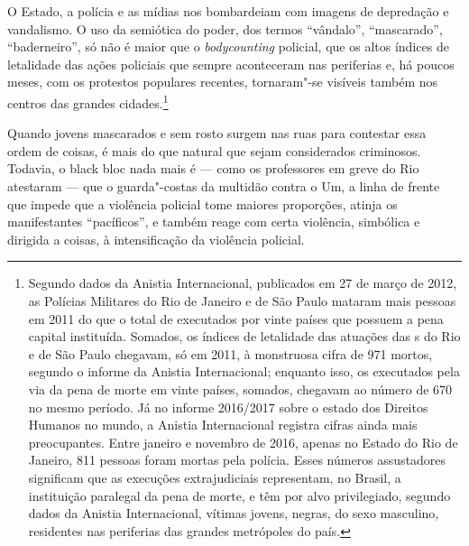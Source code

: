 O Estado, a polícia e as mídias nos bombardeiam com imagens de
depredação e vandalismo. O uso da semiótica do poder, dos termos
``vândalo'', ``mascarado'', ``baderneiro'', só não é maior que o
\emph{bodycounting} policial, que os altos índices de letalidade das
ações policiais que sempre aconteceram nas periferias e, há poucos
meses, com os protestos populares recentes, tornaram"-se visíveis também
nos centros das grandes cidades.\footnote{Segundo dados
  da Anistia Internacional, publicados em 27 de março de 2012, as
  Polícias Militares do Rio de Janeiro e de São Paulo mataram mais
  pessoas em 2011 do que o total de executados por vinte países que
  possuem a pena capital instituída. Somados, os índices de letalidade
  das atuações das s do Rio e de São Paulo chegavam, só em 2011, à
  monstruosa cifra de 971 mortos, segundo o informe da Anistia
  Internacional; enquanto isso, os executados pela via da pena de morte
  em vinte países, somados, chegavam ao número de 670 no mesmo período.
  Já no informe 2016/2017 sobre o estado dos Direitos Humanos no mundo,
  a Anistia Internacional registra cifras ainda mais preocupantes. Entre
  janeiro e novembro de 2016, apenas no Estado do Rio de Janeiro, 811
  pessoas foram mortas pela polícia. Esses números assustadores
  significam que as execuções extrajudiciais representam, no Brasil, a
  instituição paralegal da pena de morte, e têm por alvo privilegiado,
  segundo dados da Anistia Internacional, vítimas jovens, negras, do
  sexo masculino, residentes nas periferias das grandes metrópoles do
  país.}

Quando jovens mascarados e sem rosto surgem nas ruas para contestar essa
ordem de coisas, é mais do que natural que sejam considerados
criminosos. Todavia, o black bloc nada mais é --- como os professores em
greve do Rio atestaram --- que o guarda"-costas da multidão contra o Um, a
linha de frente que impede que a violência policial tome maiores
proporções, atinja os manifestantes ``pacíficos'', e também reage com
certa violência, simbólica e dirigida a coisas, à intensificação da
violência policial.

